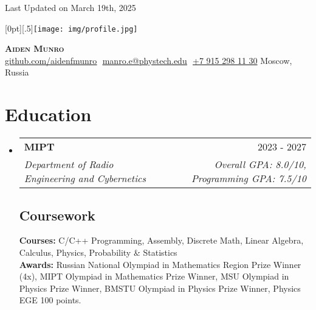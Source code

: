 \documentclass[letterpaper,11pt]{article}
\makeatletter
\newcommand{\resumeSubheading}[4]{
  \vspace{-2pt}\item
    \begin{tabular*}{0.97\textwidth}[t]{l@{\extracolsep{\fill}}r}
      \textbf{#1} & #2 \\
      \textit{\small#3} & \textit{\small #4} \\
    \end{tabular*}\vspace{-7pt}
}
\newcommand{\resumeSubHeadingListStart}{\begin{itemize}[leftmargin=0.15in, label={}]}
\newcommand{\resumeSubHeadingListEnd}{\end{itemize}}
\makeatother
\begin{document}
\begin{flushright}
  \color{gray}
  \item
  Last Updated on March 19th, 2025
\end{flushright}

\vspace{-5pt}

\raisebox{-.7\totalheight}[0pt][.5\totalheight]{\texttt{[image: img/profile.jpg]}}

\begin{center}
    \textbf{\Huge \scshape Aiden Munro} \\ \vspace{8pt}
    \small 
    \href{https://github.com/aidenfmunro}{\underline{github.com/aidenfmunro}} $  $
    \href{mailto:manro.e@phystech.edu}{\underline{manro.e@phystech.edu}} $ $
    \underline{+7 915 298 11 30} 
    Moscow, Russia
\end{center}

\section{Education}
  \resumeSubHeadingListStart
  
    \resumeSubheading
      {MIPT}{2023 - 2027}
      {Department of Radio Engineering and Cybernetics}{Overall GPA: 8.0/10, Programming GPA: 7.5/10}

    \vspace{-10pt}

    \subsection{Coursework}
      \textbf{Courses:} C/C++ Programming, Assembly, Discrete Math, Linear Algebra, Calculus, Physics, Probability \& Statistics \\
      \textbf{Awards:} Russian National Olympiad in Mathematics Region Prize Winner (4x), MIPT Olympiad in Mathematics Prize Winner, MSU Olympiad in Physics Prize Winner, BMSTU Olympiad in Physics Prize Winner, Physics EGE 100 points.

  \resumeSubHeadingListEnd

\end{document}
